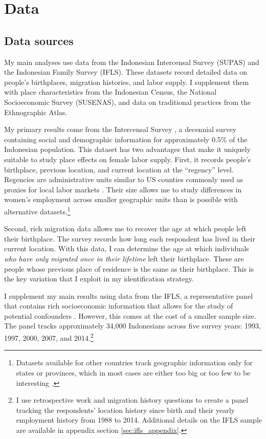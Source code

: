 \section{Data}
\label{sec:data}


\subsection{Data sources}
My main analyses use data from the Indonesian Intercensal Survey (SUPAS) and the Indonesian Family Survey (IFLS). These datasets record detailed data on people's birthplaces, migration histories, and labor supply. I supplement them with place characteristics from the Indonesian Census, the National Socioeconomic Survey (SUSENAS), and data on traditional practices from the Ethnographic Atlas.

My primary results come from the Intercensal Survey , a decennial survey containing social and demographic information for approximately 0.5\% of the Indonesian population.  This dataset has two advantages that make it uniquely suitable to study place effects on female labor supply. First, it records people's birthplace, previous location, and current location at the ``regency'' level. Regencies are administrative units similar to US counties commonly used as proxies for local labor markets \citep{Magruder2013, Bazzi2022}. Their size allows me to study differences in women's employment across smaller geographic units than is possible with alternative datasets.\footnote{Datasets available for other countries track geographic information only for states or provinces, which in most cases are either too big or too few to be interesting \citep{Bryan2019}.}

Second, rich migration data allows me to recover the age at which people left their birthplace. The survey records how long each respondent has lived in their current location. With this data, I can determine the age at which individuals \emph{who have only migrated once in their lifetime} left their birthplace. These are people whose previous place of residence is the same as their birthplace. This is the key variation that I exploit in my identification strategy. 

I supplement my main results using data from the IFLS, a representative panel that contains rich socioeconomic information that allows for the study of potential confounders . However, this comes at the cost of a smaller sample size. The panel tracks approximately 34,000 Indonesians across five survey years: 1993, 1997, 2000, 2007, and 2014.\footnote{I use retrospective work and migration history questions to create a panel tracking the respondents' location history since birth and their yearly employment history from 1988 to 2014. Additional details on the IFLS sample are available in appendix section \ref{sec:ifls_appendix}.}


